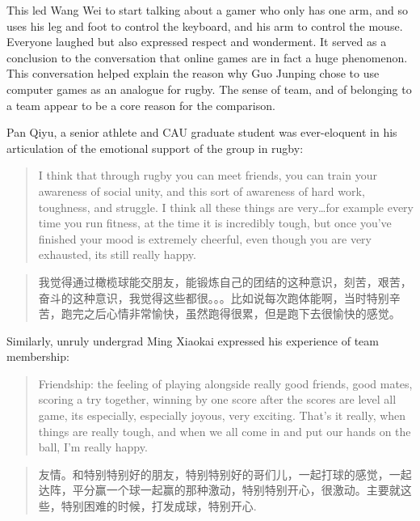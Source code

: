 \begin{CJK}{UTF8}{gbsn}
This led Wang Wei to start talking about a gamer who only has one arm, and so uses his leg and foot to control the keyboard, and his arm to control the mouse.  Everyone laughed but also expressed respect and wonderment. It served as a conclusion to the conversation that online games are in fact a huge phenomenon.  This conversation helped explain the reason why Guo Junping chose to use computer games as an analogue for rugby.  The sense of team, and of belonging to a team appear to be a core reason for the comparison.

Pan Qiyu, a senior athlete and CAU graduate student was ever-eloquent in his articulation of the emotional support of the group in rugby:

    \begin{quotation}
      I think that through rugby you can meet friends, you can train your awareness of social unity, and this sort of awareness of hard work, toughness, and struggle. I think all these things are very…for example every time you run fitness, at the time it is incredibly tough, but once you’ve finished your mood is extremely cheerful, even though you are very exhausted, its still really happy.
    \end{quotation}

    \begin{quotation}
      我觉得通过橄榄球能交朋友，能锻炼自己的团结的这种意识，刻苦，艰苦，奋斗的这种意识，我觉得这些都很。。。比如说每次跑体能啊，当时特别辛苦，跑完之后心情非常愉快，虽然跑得很累，但是跑下去很愉快的感觉。 
    \end{quotation}

Similarly, unruly undergrad Ming Xiaokai expressed his experience of team membership:

    \begin{quotation}
      Friendship: the feeling of playing alongside really good friends, good mates, scoring a try together, winning by one score after the scores are level all game, its especially, especially joyous, very exciting.  That's it really, when things are really tough, and when we all come in and put our hands on the ball, I’m really happy.
    \end{quotation}

    \begin{quotation}
       友情。和特别特别好的朋友，特别特别好的哥们儿，一起打球的感觉，一起达阵，平分赢一个球一起赢的那种激动，特别特别开心，很激动。主要就这些，特别困难的时候，打发成球，特别开心.
    \end{quotation}



\end{CJK}
